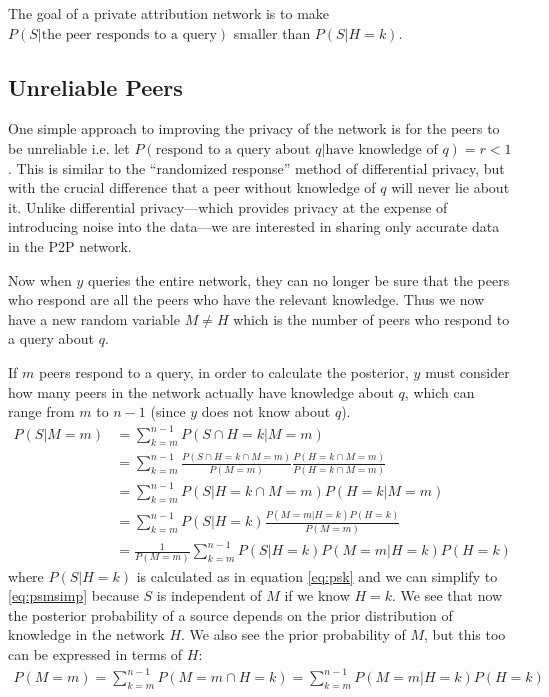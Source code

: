 \documentclass{article}
\newcommand{\eqnref}[1]{equation \eqref{eq:#1}}
\begin{document}
The goal of a private attribution network is to make $P(S|\text{the peer
responds to a query})$ smaller than $P(S|H=k)$.

\subsection{Unreliable Peers}\label{sec:unreliable}

One simple approach to improving the privacy of the network is for the peers to
be unreliable i.e. let $P(\text{respond to a query about }q|\text{have knowledge
of }q)=r<1$. This is similar to the ``randomized response'' method of
differential privacy\cite{randresps}, but with the crucial difference that a peer
without knowledge of $q$ will never lie about it. Unlike differential
privacy---which provides privacy at the expense of introducing noise into the
data---we are interested in sharing only accurate data in the P2P network.

Now when $y$ queries the entire network, they can no longer be sure
that the peers who respond are all the peers who have the relevant knowledge.
Thus we now have a new random variable $M\ne H$ which is the number of peers who
respond to a query about $q$.

If $m$ peers respond to a query, in order to calculate the posterior, $y$ must
consider how many peers in the network actually have knowledge about $q$, which
can range from $m$ to $n-1$ (since $y$ does not know about $q$).
\begin{align}
	P(S|M=m)&=\sum_{k=m}^{n-1}P(S\cap H=k|M=m)\nonumber\\
	&=\sum_{k=m}^{n-1}\frac{P(S\cap H=k\cap M=m)}{P(M=m)}\frac{P(H=k\cap
	M=m)}{P(H=k\cap M=m)}\nonumber\\
	&=\sum_{k=m}^{n-1}P(S|H=k\cap M=m)P(H=k|M=m)\nonumber\\
	&=\sum_{k=m}^{n-1}P(S|H=k)\frac{P(M=m|H=k)P(H=k)}{P(M=m)}\label{eq:psmsimp}\\
	&=\frac{1}{P(M=m)}\sum_{k=m}^{n-1}P(S|H=k)P(M=m|H=k)P(H=k)\label{eq:psmbig}
\end{align}
where $P(S|H=k)$ is calculated as in \eqnref{psk} and we can simplify to
\eqref{eq:psmsimp} because $S$ is independent of $M$ if we know $H=k$.
We see that now the posterior probability of a source depends on the prior
distribution of knowledge in the network $H$. We also see the prior probability
of $M$, but this too can be expressed in terms of $H$:
\begin{align*}
	P(M=m)=\sum_{k=m}^{n-1}P(M=m\cap H=k)=\sum_{k=m}^{n-1}P(M=m|H=k)P(H=k)
\end{align*}
\end{document}
